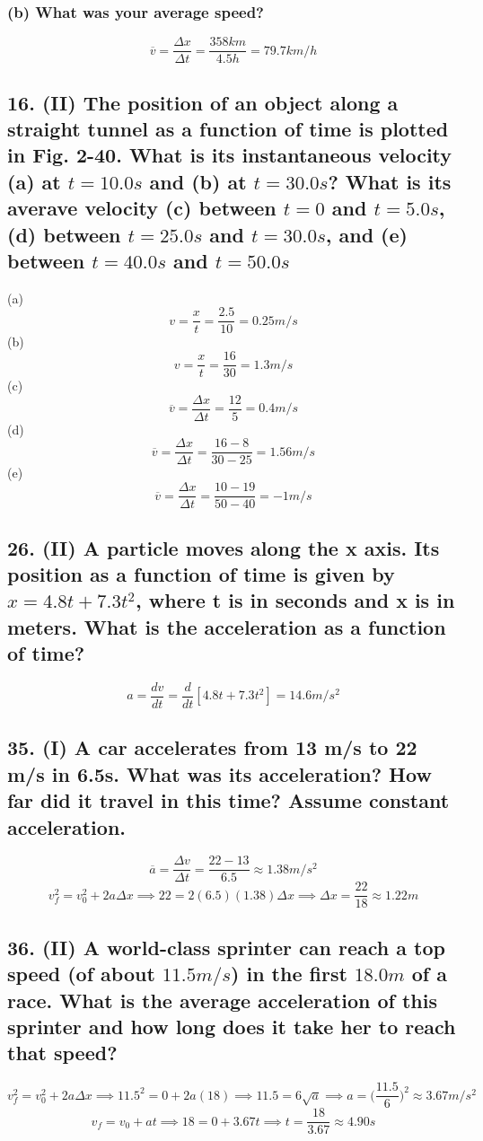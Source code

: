 \documentclass[12pt,a4paper,english]{article}
\begin{document}
\begin{flushleft}
        \subsubsection{(b) What was your average speed?}
        \[ 
          \overline{v}=\frac{\Delta x}{\Delta t}=\frac{358km}{4.5h}=79.7km/h
        \]
      \subsection{16. (II) The position of an object along a straight tunnel as a function of time is plotted in Fig. 2-40. What is its instantaneous velocity (a) at $t=10.0s$ and (b) at $t=30.0s$? What is its averave velocity (c) between $t=0$ and $t=5.0s$, (d) between $t=25.0s$ and $t=30.0s$, and (e) between $t=40.0s$ and $t=50.0s$}
      (a)
      \[
v=\frac{x}{t}=\frac{2.5}{10}=0.25m/s
      \]
      (b)
      \[
v=\frac{x}{t}=\frac{16}{30}=1.3m/s
      \]
      (c)
      \[
        \overline{v}=\frac{\Delta x}{\Delta t}=\frac{12}{5}=0.4m/s
      \]
      (d)
      \[
        \overline{v}=\frac{\Delta x}{\Delta t}=\frac{16-8}{30-25}=1.56m/s
      \]
      (e)
      \[
        \overline{v}=\frac{\Delta x}{\Delta t}=\frac{10-19}{50-40}=-1m/s
      \]
      \subsection{26. (II) A particle moves along the x axis. Its position as a function of time is given by $x=4.8t+7.3t^2$, where t is in seconds and x is in meters. What is the acceleration as a function of time?}
      \[
        a=\frac{dv}{dt}=\frac{d}{dt}[4.8t+7.3t^2]=14.6m/s^2
      \]
      \subsection{35. (I) A car accelerates from 13 m/s to 22 m/s in 6.5s. What was its acceleration? How far did it travel in this time? Assume constant acceleration.}
      \[
        \overline{a}=\frac{\Delta v}{\Delta t}=\frac{22 -13}{6.5}\approx 1.38m/s^2
      \]
      \[
        v_{f}^2=v_{0}^2+2a\Delta x \implies
        22=2(6.5)(1.38)\Delta x \implies
        \Delta x = \frac{22}{18} \approx 1.22m
      \]
      \subsection{36. (II) A world-class sprinter can reach a top speed (of about $11.5m/s$) in the first $18.0m$ of a race. What is the average acceleration of this sprinter and how long does it take her to reach that speed?}
      \[
        v_{f}^2=v_{0}^2+2a\Delta x \implies 11.5^2=0+2a(18) \implies
        11.5=6\sqrt{a}\implies 
        a=\biggr(\frac{11.5}{6}\biggr)^2 \approx 3.67m/s^2
      \]
      \[
        v_{f}=v_{0}+at\implies 18=0+3.67t\implies 
        t=\frac{18}{3.67}\approx 4.90s
      \]

\end{flushleft}
\end{document}
